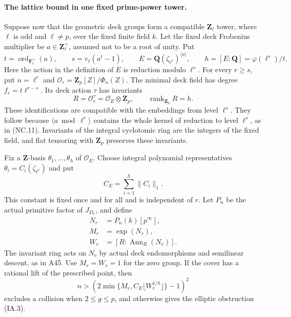 \paragraph{The lattice bound in one fixed prime-power tower.}
Suppose now that the geometric deck groups form a compatible
$\mathbf Z_\ell$ tower, where $\ell$ is odd and $\ell\ne p$, over the
fixed finite field $k$. Let the fixed deck Frobenius multiplier be
$a\in\mathbf Z_\ell^\times$, assumed not to be a root of unity. Put
\[
 t=\operatorname{ord}_{\mathbf F_\ell^\times}(a),\qquad
 s=v_\ell(a^t-1),\qquad
 E=\mathbf Q(\zeta_{\ell^s})^{\langle a\rangle},\qquad
 h=[E:\mathbf Q]=\varphi(\ell^s)/t.
\tag{IA.10}
\]
Here the action in the definition of $E$ is reduction modulo $\ell^s$.
For every $r\ge s$, put $n=\ell^r$ and
$\mathcal O_r=\mathbf Z_p[Z]/\Phi_n(Z)$. The minimal deck field has
degree $f_r=t\ell^{r-s}$. Its deck action $\tau$ has invariants
\[
 R=\mathcal O_r^\tau=\mathcal O_E\otimes\mathbf Z_p,
                      \qquad \operatorname{rank}_{\mathbf Z_p}R=h.
\tag{IA.11}
\]
These identifications are compatible with the embeddings from level
$\ell^s$. They follow because $\langle a\bmod\ell^r\rangle$ contains
the whole kernel of reduction to level $\ell^s$, as in (NC.11).
Invariants of the integral cyclotomic ring are the integers of the
fixed field, and flat tensoring with $\mathbf Z_p$ preserves these
invariants.

Fix a $\mathbf Z$-basis $\theta_1,\ldots,\theta_h$ of $\mathcal O_E$.
Choose integral polynomial representatives
$\theta_i=C_i(\zeta_{\ell^s})$ and put
\[
                         C_E=\sum_{i=1}^h\|C_i\|_1.
\tag{IA.12}
\]
This constant is fixed once and for all and is independent of $r$.
Let $P_n$ be the actual primitive factor of $J_{D_r}$, and define
\[
 \begin{aligned}
 N_r&=P_n(k)[p^\infty],\\
 M_r&=\exp(N_r),\\
 W_r&=[R:\operatorname{Ann}_R(N_r)].
 \end{aligned}
\tag{IA.13}
\]
The invariant ring acts on $N_r$ by actual deck endomorphisms and
semilinear descent, as in A45. Use $M_r=W_r=1$ for the zero group.
If the cover has a rational lift of the prescribed point, then
\[
 n>\left(2\min\{M_r,C_E\lfloor W_r^{1/h}\rfloor\}-1\right)^2
\tag{IA.14}
\]
excludes a collision when $2\le g\le p$, and otherwise gives the
elliptic obstruction (IA.3).

